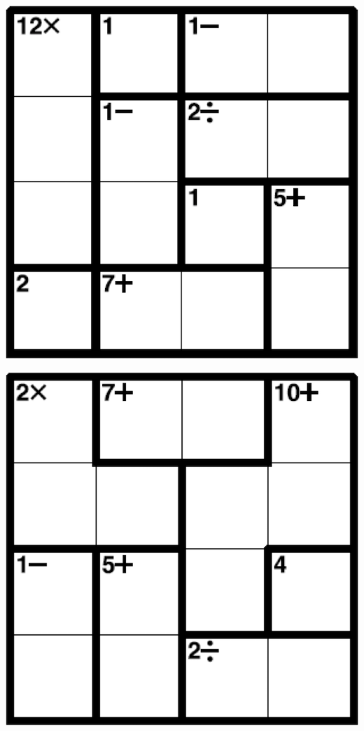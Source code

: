 
\includegraphics[scale=1]{Gambar/Lampiran/4x4_35.png}

\includegraphics[scale=1]{Gambar/Lampiran/4x4_36.png}
